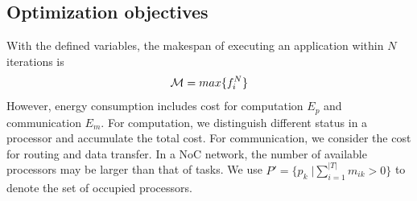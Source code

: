 
%
%

\subsection{Optimization objectives}

With the defined variables, the makespan of  executing an application within $N$ iterations is 
\begin{equation}\label{eq:makespan}
{\cal{M}}=max\{f^N_i\}
\end{equation}
However, energy consumption includes cost for computation $E_p$ and communication $E_m$. For computation, we distinguish different status in a processor and accumulate the total cost. For communication, we consider the cost for routing and data transfer. In a NoC network, the number of available processors may be larger than that of tasks. We use $P'=\{p_k\;| \sum^{|T|}_{i=1} m_{ik}>0\}$ to denote the set of occupied processors. 

